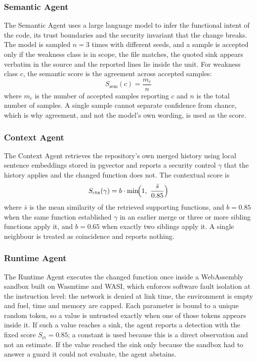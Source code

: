 \documentclass[conference]{IEEEtran}
\begin{document}
\subsubsection{Semantic Agent}
The Semantic Agent uses a large language model to infer the functional
intent of the code, its trust boundaries and the security invariant that
the change breaks. The model is sampled $n=3$ times with different seeds,
and a sample is accepted only if the weakness class is in scope, the file
matches, the quoted sink appears verbatim in the source and the reported
lines lie inside the unit. For weakness class $c$, the semantic score is
the agreement across accepted samples:
\begin{equation}
S_{\mathrm{sem}}(c)=\frac{m_c}{n}
\label{eq:sem}
\end{equation}
where $m_c$ is the number of accepted samples reporting $c$ and $n$ is the
total number of samples. A single sample cannot separate confidence from
chance, which is why agreement, and not the model's own wording, is used
as the score.

\subsubsection{Context Agent}
The Context Agent retrieves the repository's own merged history using local
sentence embeddings stored in pgvector and reports a security control
$\gamma$ that the history applies and the changed function does not. The
contextual score is
\begin{equation}
S_{\mathrm{ctx}}(\gamma)=b\cdot\min\!\Bigl(1,\ \frac{\bar{s}}{0.85}\Bigr)
\label{eq:ctx}
\end{equation}
where $\bar{s}$ is the mean similarity of the retrieved supporting
functions, and $b=0.85$ when the same function established $\gamma$ in an
earlier merge or three or more sibling functions apply it, and $b=0.65$
when exactly two siblings apply it. A single neighbour is treated as
coincidence and reports nothing.

\subsubsection{Runtime Agent}
The Runtime Agent executes the changed function once inside a WebAssembly
sandbox built on Wasmtime and WASI, which enforces software fault isolation
at the instruction level: the network is denied at link time, the
environment is empty and fuel, time and memory are capped. Each parameter
is bound to a unique random token, so a value is untrusted exactly when one
of those tokens appears inside it. If such a value reaches a sink, the
agent reports a detection with the fixed score $S_{\mathrm{rt}}=0.85$; a
constant is used because this is a direct observation and not an estimate.
If the value reached the sink only because the sandbox had to answer a
guard it could not evaluate, the agent abstains.
\end{document}
